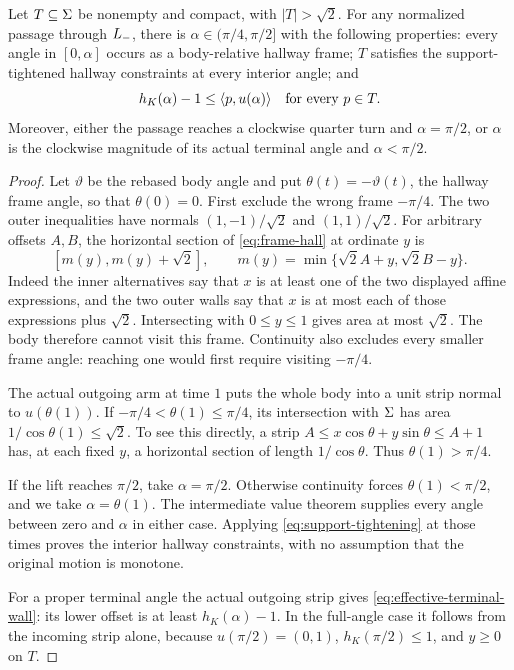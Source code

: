 \begin{lemma}\label{lem:effective-angle}
Let $T\subseteq\Sigma$ be nonempty and compact, with $|T|>\sqrt2$.
For any normalized passage through $L_-$, there is
$\alpha\in(\pi/4,\pi/2]$ with the following properties:
every angle in $[0,\alpha]$ occurs as a body-relative hallway frame;
$T$ satisfies the support-tightened hallway constraints at every
interior angle; and
\begin{equation}\label{eq:effective-terminal-wall}
 h_K(\alpha)-1\le\langle p,u(\alpha)\rangle\quad\text{for every }p\in T.
\end{equation}
Moreover, either the passage reaches a clockwise quarter turn and
$\alpha=\pi/2$, or $\alpha$ is the clockwise magnitude of its actual
terminal angle and $\alpha<\pi/2$.
\end{lemma}

\begin{proof}
Let $\vartheta$ be the rebased body angle and put
$\theta(t)=-\vartheta(t)$, the hallway frame angle, so that
$\theta(0)=0$. First exclude the wrong frame $-\pi/4$.
The two outer inequalities have normals $(1,-1)/\sqrt2$ and $(1,1)/\sqrt2$.
For arbitrary offsets $A,B$, the horizontal section of
\eqref{eq:frame-hall} at ordinate $y$ is
\[
 [m(y),m(y)+\sqrt2],\qquad
 m(y)=\min\{\sqrt2 A+y,\sqrt2 B-y\}.
\]
Indeed the inner alternatives say that $x$ is at least one of the
two displayed affine expressions, and the two outer walls say that
$x$ is at most each of those expressions plus $\sqrt2$.
Intersecting with $0\le y\le1$ gives area at most $\sqrt2$.
The body therefore cannot visit this frame. Continuity also excludes
every smaller frame angle: reaching one would first require visiting
$-\pi/4$.

The actual outgoing arm at time $1$ puts the whole body into a unit
strip normal to $u(\theta(1))$. If
$-\pi/4<\theta(1)\le\pi/4$, its intersection with $\Sigma$ has
area $1/\cos\theta(1)\le\sqrt2$. To see this directly, a strip
$A\le x\cos\theta+y\sin\theta\le A+1$ has, at each fixed
$y$, a horizontal section of length $1/\cos\theta$.
Thus $\theta(1)>\pi/4$.

If the lift reaches $\pi/2$, take $\alpha=\pi/2$. Otherwise
continuity forces $\theta(1)<\pi/2$, and we take
$\alpha=\theta(1)$. The intermediate value theorem supplies every
angle between zero and $\alpha$ in either case. Applying
\eqref{eq:support-tightening} at those times proves the interior
hallway constraints, with no assumption that the original motion is
monotone.

For a proper terminal angle the actual outgoing strip gives
\eqref{eq:effective-terminal-wall}: its lower offset is at least
$h_K(\alpha)-1$. In the full-angle case it follows
from the incoming strip alone, because $u(\pi/2)=(0,1)$,
$h_K(\pi/2)\le1$, and $y\ge0$ on $T$.

\end{proof}

